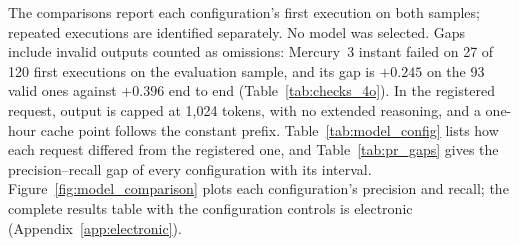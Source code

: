 The comparisons report each configuration's first execution on both samples; repeated executions are identified separately. No model was selected. Gaps include invalid outputs counted as omissions: Mercury~3 instant failed on 27 of 120 first executions on the evaluation sample, and its gap is $+0.245$ on the 93 valid ones against $+0.396$ end to end (Table~\ref{tab:checks_4o}). In the registered request, output is capped at 1{,}024 tokens, with no extended reasoning, and a one-hour cache point follows the constant prefix. Table~\ref{tab:model_config} lists how each request differed from the registered one, and Table~\ref{tab:pr_gaps} gives the precision--recall gap of every configuration with its interval. Figure~\ref{fig:model_comparison} plots each configuration's precision and recall; the complete results table with the configuration controls is electronic (Appendix~\ref{app:electronic}).

